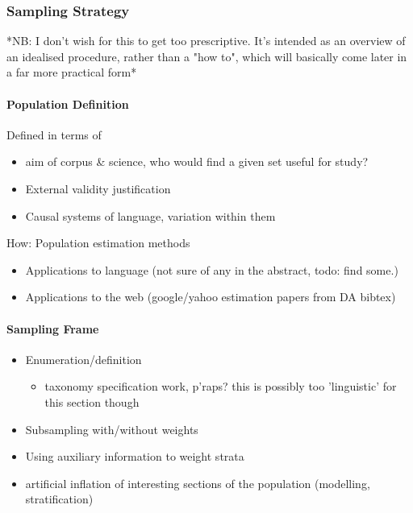 \subsubsection{Sampling Strategy}
*NB: I don't wish for this to get too prescriptive.  It's intended as an overview of an idealised procedure, rather than a "how to", which will basically come later in a far more practical form*

\paragraph{Population Definition}
Defined in terms of

\begin{itemize}
 \item aim of corpus \& science, who would find a given set useful for study?
 \item External validity justification
 \item Causal systems of language, variation within them
\end{itemize}

How: Population estimation methods

\begin{itemize}
 \item Applications to language (not sure of any in the abstract, todo: find some.)
 \item Applications to the web (google/yahoo estimation papers from DA bibtex)
\end{itemize}




\paragraph{Sampling Frame}

\begin{itemize}
 \item Enumeration/definition
    \begin{itemize}
    \item taxonomy specification work, p'raps?  this is possibly too 'linguistic' for this section though
    \end{itemize}
 \item Subsampling with/without weights
 \item Using auxiliary information to weight strata
 \item artificial inflation of interesting sections of the population (modelling, stratification)
\end{itemize}



